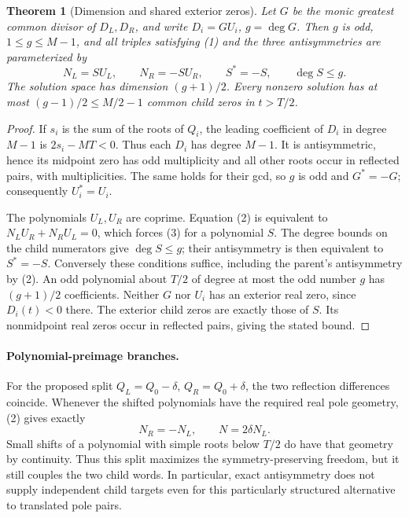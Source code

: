 \documentclass[11pt]{article}
\newtheorem{theorem}{Theorem}
\begin{document}
\begin{theorem}[Dimension and shared exterior zeros]
Let $G$ be the monic greatest common divisor of $D_L,D_R$, and write
$D_i=G U_i$, $g=\deg G$. Then $g$ is odd, $1\leq g\leq M-1$, and
all triples satisfying (1) and the three antisymmetries are parameterized
by
\[
 N_L=S U_L,\qquad N_R=-S U_R,\qquad S^\ast=-S,
 \qquad \deg S\leq g.                                      \tag{3}
\]
The solution space has dimension $(g+1)/2$. Every nonzero solution has
at most $(g-1)/2\leq M/2-1$ common child zeros in $t>T/2$.
\end{theorem}
\begin{proof}
If $s_i$ is the sum of the roots of $Q_i$, the leading coefficient of
$D_i$ in degree $M-1$ is $2s_i-MT<0$. Thus each $D_i$ has degree $M-1$.
It is antisymmetric, hence its midpoint zero has odd multiplicity and
all other roots occur in reflected pairs, with multiplicities. The same
holds for their gcd, so $g$ is odd and $G^\ast=-G$; consequently
$U_i^\ast=U_i$.

The polynomials $U_L,U_R$ are coprime. Equation (2) is equivalent to
$N_LU_R+N_RU_L=0$, which forces (3) for a polynomial $S$. The degree
bounds on the child numerators give $\deg S\leq g$; their antisymmetry
is then equivalent to $S^\ast=-S$. Conversely these conditions suffice,
including the parent's antisymmetry by (2). An odd polynomial about
$T/2$ of degree at most the odd number $g$ has $(g+1)/2$ coefficients.
Neither $G$ nor $U_i$ has an exterior real zero, since $D_i(t)<0$ there.
The exterior child zeros are exactly those of $S$. Its nonmidpoint real
zeros occur in reflected pairs, giving the stated bound.
\end{proof}

\paragraph{Polynomial-preimage branches.}
For the proposed split $Q_L=Q_0-\delta$, $Q_R=Q_0+\delta$, the two
reflection differences coincide. Whenever the shifted polynomials have
the required real pole geometry, (2) gives exactly
\[
 N_R=-N_L,\qquad N=2\delta N_L.
\]
Small shifts of a polynomial with simple roots below $T/2$ do have that
geometry by continuity. Thus this split maximizes the symmetry-preserving
freedom, but it still couples the two child words. In particular, exact
antisymmetry does not supply independent child targets even for this
particularly structured alternative to translated pole pairs.
\end{document}
